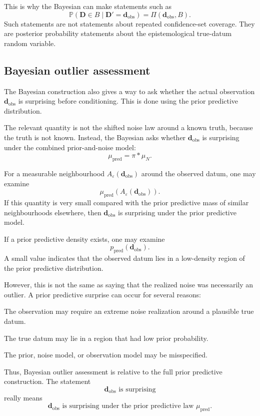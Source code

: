 \documentclass[11pt]{article}
\newcommand{\muN}{\mu_N}
\newcommand{\prior}{\pi}
\newcommand{\Drand}{\mathbf D}
\newcommand{\Dobsrand}{\mathbf D'}
\newcommand{\dobs}{\mathbf d_{\mathrm{obs}}}
\newcommand{\Prob}{\mathbb P}
\begin{document}
This is why the Bayesian can make statements such as
\[
    \Prob(\Drand\in B\mid \Dobsrand=\dobs)
    =
    \Pi(\dobs,B).
\]
Such statements are not statements about repeated confidence-set coverage. They are posterior probability statements about the epistemological true-datum random variable.

\subsection{Bayesian outlier assessment}

The Bayesian construction also gives a way to ask whether the actual observation \(\dobs\) is surprising before conditioning. This is done using the prior predictive distribution.

The relevant quantity is not the shifted noise law around a known truth, because the truth is not known. Instead, the Bayesian asks whether \(\dobs\) is surprising under the combined prior-and-noise model:
\[
    \mu_{\mathrm{pred}}
    =
    \prior * \muN.
\]

For a measurable neighbourhood \(A_{\varepsilon}(\dobs)\) around the observed datum, one may examine
\[
    \mu_{\mathrm{pred}}\!\left(A_{\varepsilon}(\dobs)\right).
\]
If this quantity is very small compared with the prior predictive mass of similar neighbourhoods elsewhere, then \(\dobs\) is surprising under the prior predictive model.

If a prior predictive density exists, one may examine
\[
    p_{\mathrm{pred}}(\dobs).
\]
A small value indicates that the observed datum lies in a low-density region of the prior predictive distribution.

However, this is not the same as saying that the realized noise was necessarily an outlier. A prior predictive surprise can occur for several reasons:
\begin{description}[leftmargin=3.1cm,style=nextline]
    \item[Noise outlier.]
    The observation may require an extreme noise realization around a plausible true datum.

    \item[Prior surprise.]
    The true datum may lie in a region that had low prior probability.

    \item[Model failure.]
    The prior, noise model, or observation model may be misspecified.
\end{description}

Thus, Bayesian outlier assessment is relative to the full prior predictive construction. The statement
\[
    \dobs
    \text{ is surprising}
\]
really means
\[
    \dobs
    \text{ is surprising under the prior predictive law }
    \mu_{\mathrm{pred}}.
\]
\end{document}
